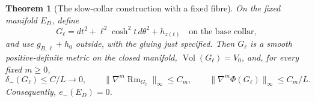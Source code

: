 \documentclass[a4paper,11pt]{article}
\numberwithin{equation}{section}
\newtheorem{theorem}{Theorem}[section]
\theoremstyle{definition}
\newcommand{\Rm}{\operatorname{Rm}}
\newcommand{\Vol}{\operatorname{Vol}}
\begin{document}
\begin{theorem}[The slow-collar construction with a fixed fibre]\label{thm:ED-slow}
On the fixed manifold $E_D$, define
\begin{equation}\label{eq:ED-slow-metric}
G_\ell=dt^2+\ell^2\cosh^2t\,d\theta^2+h_{z(t)}
\quad\text{on the base collar},
\end{equation}
and use $g_{B,\ell}+h_0$ outside, with the gluing just specified.
Then $G_\ell$ is a smooth positive-definite metric on the closed manifold, $\Vol(G_\ell)=V_0$,
and, for every fixed $m\ge0$,
\begin{equation}\label{eq:ED-slow-geometric}
\delta_-(G_\ell)\le C/L\longrightarrow0,\qquad
\|\nabla^m\Rm_{G_\ell}\|_\infty\le C_m,\qquad
\|\nabla^m\Phi(G_\ell)\|_\infty\le C_m/L.
\end{equation}
Consequently, $e_-(E_D)=0$.
\end{theorem}
\end{document}
